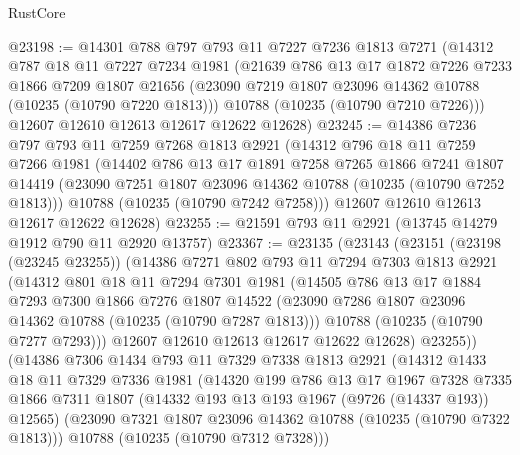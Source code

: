 \begin{lexlean}{RustCore}
\begin{coremodule}
@23198 := @14301
    @788
    @797
    @793
    @11
    @7227
    @7236
    @1813
    @7271
    (@14312
      @787
      @18
      @11
      @7227
      @7234
      @1981
      (@21639
        @786
        @13
        @17
        @1872
        @7226
        @7233
        @1866
        @7209
        @1807
        @21656
        (@23090 @7219 @1807 @23096 @14362 @10788 (@10235 (@10790 @7220 @1813)))
        @10788
        (@10235 (@10790 @7210 @7226)))
      @12607
      @12610
      @12613
      @12617
      @12622
      @12628)
@23245 := @14386
    @7236
    @797
    @793
    @11
    @7259
    @7268
    @1813
    @2921
    (@14312
      @796
      @18
      @11
      @7259
      @7266
      @1981
      (@14402
        @786
        @13
        @17
        @1891
        @7258
        @7265
        @1866
        @7241
        @1807
        @14419
        (@23090 @7251 @1807 @23096 @14362 @10788 (@10235 (@10790 @7252 @1813)))
        @10788
        (@10235 (@10790 @7242 @7258)))
      @12607
      @12610
      @12613
      @12617
      @12622
      @12628)
@23255 := @21591 @793 @11 @2921 (@13745 @14279 @1912 @790 @11 @2920 @13757)
@23367 := @23135
    (@23143
      (@23151
        (@23198 (@23245 @23255))
        (@14386
          @7271
          @802
          @793
          @11
          @7294
          @7303
          @1813
          @2921
          (@14312
            @801
            @18
            @11
            @7294
            @7301
            @1981
            (@14505
              @786
              @13
              @17
              @1884
              @7293
              @7300
              @1866
              @7276
              @1807
              @14522
              (@23090 @7286 @1807 @23096 @14362 @10788 (@10235 (@10790 @7287 @1813)))
              @10788
              (@10235 (@10790 @7277 @7293)))
            @12607
            @12610
            @12613
            @12617
            @12622
            @12628)
          @23255))
      (@14386
        @7306
        @1434
        @793
        @11
        @7329
        @7338
        @1813
        @2921
        (@14312
          @1433
          @18
          @11
          @7329
          @7336
          @1981
          (@14320
            @199
            @786
            @13
            @17
            @1967
            @7328
            @7335
            @1866
            @7311
            @1807
            (@14332 @193 @13 @193 @1967 (@9726 (@14337 @193)) @12565)
            (@23090 @7321 @1807 @23096 @14362 @10788 (@10235 (@10790 @7322 @1813)))
            @10788
            (@10235 (@10790 @7312 @7328)))

\end{coremodule}
\end{lexlean}

